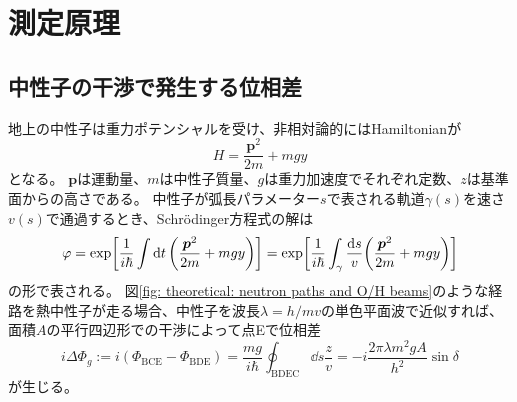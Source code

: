 \documentclass[dvipdfmx]{jsarticle}
\begin{document}
\section{測定原理}


\subsection{中性子の干渉で発生する位相差}

地上の中性子は重力ポテンシャルを受け、非相対論的にはHamiltonianが
\begin{equation*}
    H
    =
    \frac{\bm{p}^2}{2m}+mgy
\end{equation*}
となる。
$\bm{p}$は運動量、$m$は中性子質量、$g$は重力加速度でそれぞれ定数、$z$は基準面からの高さである。
中性子が弧長パラメーター$s$で表される軌道$\gamma(s)$を速さ$v(s)$で通過するとき、Schrödinger方程式の解は
\begin{equation*}
    \varphi
    =
    \exp[
        \frac{1}{i\hbar}\int\dd{t}
        \qty(
            \frac{\bm{p}^2}{2m}+mgy
        )
    ]
    =
    \exp[
        \frac{1}{i\hbar}\int_\gamma\frac{\dd{s}}{v}
        \qty(\frac{\bm{p}^2}{2m}+mgy)
    ]
\end{equation*}
の形で表される。
図\ref{fig: theoretical: neutron paths and O/H beams}のような経路を熱中性子が走る場合、中性子を波長$\lambda=h/mv$の単色平面波で近似すれば、面積$A$の平行四辺形での干渉によって点Eで位相差
\begin{equation}
    \label{eq: theoretical: delta phi g ideal}
    i\Delta\Phi_g
    :=
    i(\Phi_\mathrm{BCE}-\Phi_\mathrm{BDE})
    =
    \frac{mg}{i\hbar}
    \oint_\mathrm{BDEC}\dd{s}\frac{z}{v}
    =
    -i\frac{2\pi\lambda m^2gA}{h^2}\sin\delta
\end{equation}
が生じる。
\end{document}
